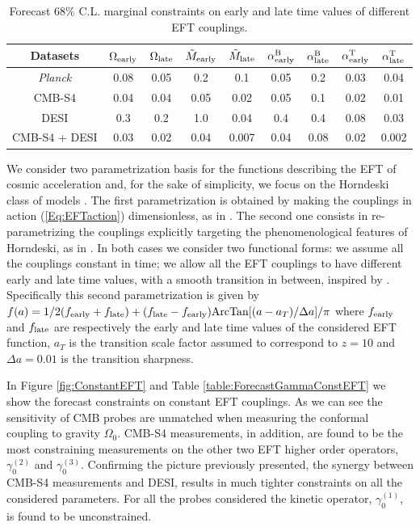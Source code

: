\begin{table}[t!]
\begin{center}
\begin{tabular}{|c||c|c||c|c|c|c|c|c|} 
\hline
Datasets 			& $\Omega_{\rm early}$ & $\Omega_{\rm late}$ & $\tilde{M}_{\rm early}$ &  $\tilde{M}_{\rm late}$ & $\alpha^{\rm B}_{\rm early}$ & $\alpha^{\rm B}_{\rm late}$ & $\alpha^{\rm T}_{\rm early}$  & $\alpha^{\rm T}_{\rm late}$   \\
\hline
\hline
{\it Planck}  		& 0.08 & 0.05 & 0.2 &  0.1 & 0.05 & 0.2 & 0.03 & 0.04 \\
\hline
CMB-S4       &  0.04 &  0.04 & 0.05 & 0.02 & 0.05 & 0.1 & 0.02 & 0.01 \\
\hline
DESI            & 0.3 & 0.2 & 1.0 & 0.04 & 0.4 & 0.4 & 0.08 & 0.03 \\
\hline
CMB-S4 + DESI  &  0.03 &  0.02 & 0.04 & 0.007 & 0.04 & 0.08 & 0.02 & 0.002\\
\hline
\end{tabular}
\caption{Forecast $68\%$ C.L. marginal constraints on early and late time values of different EFT couplings.}
\label{table:ForecastAlphaAtan}
\end{center}
\end{table}

We consider two parametrization basis for the functions describing the EFT of cosmic acceleration and, for the sake of simplicity, we focus on the Horndeski class of models \cite{Horndeski:1974wa}.
%
The first parametrization is obtained by making the couplings in action (\ref{Eq:EFTaction}) dimensionless, as in \cite{Hu:2014oga}.
The second one consists in re-parametrizing the couplings explicitly targeting the phenomenological features of Horndeski, as in \cite{Bellini:2014fua}.
%
In both cases we consider two functional forms: we assume all the couplings constant in time; we allow all the EFT couplings to have different early and late time values, with a smooth transition in between, inspired by \cite{Linder:2015rcz}. Specifically this second parametrization is given by $f(a)= 1/2 (f_{\rm early} + f_{\rm late}) + ( f_{\rm late} -f_{\rm early} ) {\rm ArcTan}[(a - a_T)/\Delta a]/\pi$ where $f_{\rm early}$ and $f_{\rm late}$ are respectively the early and late time values of the considered EFT function, $a_T$ is the transition scale factor assumed to correspond to $z=10$ and $\Delta a=0.01$ is the transition sharpness. 
%

In Figure \ref{fig:ConstantEFT} and Table \ref{table:ForecastGammaConstEFT} we show the forecast constraints on constant EFT couplings. As we can see the sensitivity of CMB probes are unmatched when measuring the conformal coupling to gravity $\Omega_0$. 
CMB-S4 measurements, in addition, are found to be the most constraining measurements on the other two EFT higher order operators, $\gamma_0^{(2)}$ and $\gamma_0^{(3)}$. Confirming the picture previously presented, the synergy between CMB-S4 measurements and DESI, results in much tighter constraints on all the considered parameters.
For all the probes considered the kinetic operator, $\gamma_0^{(1)}$, is found to be unconstrained. 

